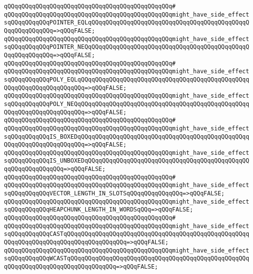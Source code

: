 \verb|qQQqqQQqqQQqqQQqqQQqqQQqqQQqqQQqqQQqqQQqqQQqqQQq#|\newline
\verb|qQQqqQQqqQQqqQQqqQQqqQQqqQQqqQQqqQQqqQQqqQQqqQQqmight_have_side_effectsqQQqqQQqqQQqPOINTER_EQLqQQqqQQqqQQqqQQqqQQqqQQqqQQqqQQqqQQqqQQqqQQqqQQqqQQqqQQqqQQq=>qQQqFALSE;|\newline
\verb|qQQqqQQqqQQqqQQqqQQqqQQqqQQqqQQqqQQqqQQqqQQqqQQqmight_have_side_effectsqQQqqQQqqQQqPOINTER_NEQqQQqqQQqqQQqqQQqqQQqqQQqqQQqqQQqqQQqqQQqqQQqqQQqqQQqqQQqqQQq=>qQQqFALSE;|\newline
\verb|qQQqqQQqqQQqqQQqqQQqqQQqqQQqqQQqqQQqqQQqqQQqqQQq#|\newline
\verb|qQQqqQQqqQQqqQQqqQQqqQQqqQQqqQQqqQQqqQQqqQQqqQQqmight_have_side_effectsqQQqqQQqqQQqPOLY_EQLqQQqqQQqqQQqqQQqqQQqqQQqqQQqqQQqqQQqqQQqqQQqqQQqqQQqqQQqqQQqqQQqqQQqqQQq=>qQQqFALSE;|\newline
\verb|qQQqqQQqqQQqqQQqqQQqqQQqqQQqqQQqqQQqqQQqqQQqqQQqmight_have_side_effectsqQQqqQQqqQQqPOLY_NEQqQQqqQQqqQQqqQQqqQQqqQQqqQQqqQQqqQQqqQQqqQQqqQQqqQQqqQQqqQQqqQQqqQQqqQQq=>qQQqFALSE;|\newline
\verb|qQQqqQQqqQQqqQQqqQQqqQQqqQQqqQQqqQQqqQQqqQQqqQQq#|\newline
\verb|qQQqqQQqqQQqqQQqqQQqqQQqqQQqqQQqqQQqqQQqqQQqqQQqmight_have_side_effectsqQQqqQQqqQQqIS_BOXEDqQQqqQQqqQQqqQQqqQQqqQQqqQQqqQQqqQQqqQQqqQQqqQQqqQQqqQQqqQQqqQQqqQQqqQQq=>qQQqFALSE;|\newline
\verb|qQQqqQQqqQQqqQQqqQQqqQQqqQQqqQQqqQQqqQQqqQQqqQQqmight_have_side_effectsqQQqqQQqqQQqIS_UNBOXEDqQQqqQQqqQQqqQQqqQQqqQQqqQQqqQQqqQQqqQQqqQQqqQQqqQQqqQQqqQQqqQQq=>qQQqFALSE;|\newline
\verb|qQQqqQQqqQQqqQQqqQQqqQQqqQQqqQQqqQQqqQQqqQQqqQQq#|\newline
\verb|qQQqqQQqqQQqqQQqqQQqqQQqqQQqqQQqqQQqqQQqqQQqqQQqmight_have_side_effectsqQQqqQQqqQQqVECTOR_LENGTH_IN_SLOTSqQQqqQQqqQQqqQQq=>qQQqFALSE;|\newline
\verb|qQQqqQQqqQQqqQQqqQQqqQQqqQQqqQQqqQQqqQQqqQQqqQQqmight_have_side_effectsqQQqqQQqqQQqHEAPCHUNK_LENGTH_IN_WORDSqQQq=>qQQqFALSE;|\newline
\verb|qQQqqQQqqQQqqQQqqQQqqQQqqQQqqQQqqQQqqQQqqQQqqQQq#|\newline
\verb|qQQqqQQqqQQqqQQqqQQqqQQqqQQqqQQqqQQqqQQqqQQqqQQqmight_have_side_effectsqQQqqQQqqQQqCASTqQQqqQQqqQQqqQQqqQQqqQQqqQQqqQQqqQQqqQQqqQQqqQQqqQQqqQQqqQQqqQQqqQQqqQQqqQQqqQQqqQQqqQQq=>qQQqFALSE;|\newline
\verb|qQQqqQQqqQQqqQQqqQQqqQQqqQQqqQQqqQQqqQQqqQQqqQQqmight_have_side_effectsqQQqqQQqqQQqWCASTqQQqqQQqqQQqqQQqqQQqqQQqqQQqqQQqqQQqqQQqqQQqqQQqqQQqqQQqqQQqqQQqqQQqqQQqqQQqqQQqqQQq=>qQQqFALSE;|\newline

